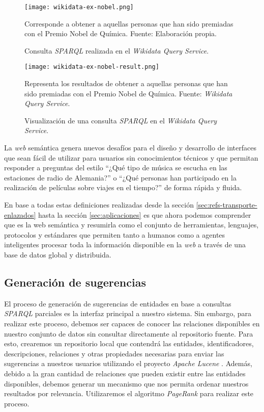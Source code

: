 \begin{figure}
    \centering
    \texttt{[image: wikidata-ex-nobel.png]}
    \caption{Consulta \textit{SPARQL} realizada en el \textit{Wikidata Query
    Service}.} Corresponde a obtener a aquellas personas que han sido premiadas
    con el Premio Nobel de Química. Fuente: Elaboración propia.
    \label{fig:wikidata-ex-nobel}
\end{figure}

\begin{figure}
    \centering
    \texttt{[image: wikidata-ex-nobel-result.png]}
    \caption{Visualización de una consulta \textit{SPARQL} en el
    \textit{Wikidata Query Service}.} Representa los resultados de obtener a
    aquellas personas que han sido premiadas con el Premio Nobel de Química.
    Fuente: \textit{Wikidata Query Service}.
    \label{fig:wikidata-ex-nobel-result}
\end{figure}

La \textit{web} semántica genera nuevos desafíos para el diseño y desarrollo de
interfaces que sean fácil de utilizar para usuarios sin conocimientos técnicos y
que permitan responder a preguntas del estilo ``¿Qué tipo de música se escucha
en las estaciones de radio de Alemania?'' o ``¿Qué personas han participado en
la realización de películas sobre viajes en el tiempo?'' de forma rápida y
fluida.

En base a todas estas definiciones realizadas desde la sección
\ref{sec:refs-transporte-enlazados} hasta la sección \ref{sec:aplicaciones} es
que ahora podemos comprender que es la web semántica y resumirla como el
conjunto de herramientas, lenguajes, protocolos y estándares que permiten tanto
a humanos como a agentes inteligentes procesar toda la información disponible en
la \textit{web} a través de una base de datos global y distribuida.

\subsection{Generación de sugerencias}

El proceso de generación de sugerencias de entidades en base a consultas
\textit{SPARQL} parciales es la interfaz principal a nuestro sistema. Sin
embargo, para realizar este proceso, debemos ser capaces de conocer las
relaciones disponibles en nuestro conjunto de datos sin consultar directamente
al repositorio fuente. Para esto, crearemos un repositorio local que contendrá
las entidades, identificadores, descripciones, relaciones y otras propiedades
necesarias para enviar las sugerencias a nuestros usuarios utilizando el
proyecto \textit{Apache Lucene} \cite{apache2012welcome}. Además, debido a la
gran cantidad de relaciones que pueden existir entre las entidades disponibles,
debemos generar un mecanismo que nos permita ordenar nuestros resultados por
relevancia. Utilizaremos el algoritmo \textit{PageRank} \cite{page1999pagerank}
para realizar este proceso.

